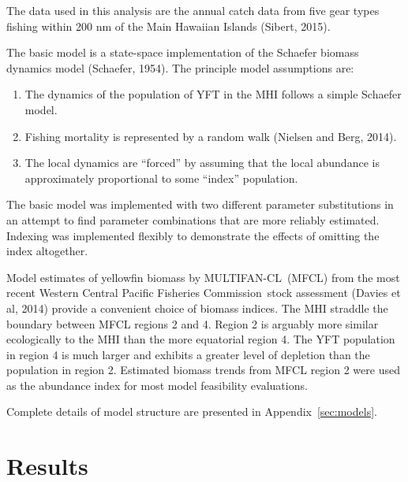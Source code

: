 \documentclass[12pt,letterpaper,twoside]{article}
\newcommand\MFCL{MULTIFAN-CL}
\newcommand\WCPFC{Western Central Pacific Fisheries Commission}
\begin{document}
The data used in this analysis are the annual catch data from
five gear types fishing within 200 nm of the Main Hawaiian Islands
(Sibert, 2015).

The basic model is a state-space implementation of the
Schaefer biomass dynamics model (Schaefer, 1954).
The principle model assumptions are:
\begin{enumerate}
\item The dynamics of the population of YFT in the MHI follows a
simple Schaefer model.
\item Fishing mortality is represented by a random walk (Nielsen and
Berg, 2014).
\item The local dynamics are ``forced'' by assuming that the local
abundance is approximately proportional to some ``index'' population.
\end{enumerate}

The basic model was implemented with two different parameter
substitutions in an attempt to find parameter combinations that are
more reliably estimated. Indexing was implemented flexibly to
demonstrate the effects of omitting the index altogether.

Model estimates of yellowfin biomass by \MFCL\ (MFCL)
from the most recent \WCPFC\ stock assessment (Davies et al, 2014) provide
a convenient choice of biomass indices. The MHI straddle the
boundary between MFCL regions 2 and 4. Region 2 is arguably more similar
ecologically to the MHI than the more equatorial region 4. The
YFT population
in region 4 is much larger and exhibits a greater level of depletion than the
population in region 2. Estimated biomass trends from MFCL region 2
were used as the abundance index for most model feasibility evaluations.

Complete details of model structure are presented in Appendix~\ref{sec:models}.



\section{Results}
\end{document}

